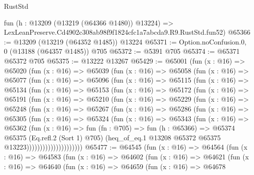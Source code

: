 \begin{lexlean}{RustStd}
\begin{coremodule}
    fun (h : @13209 (@13219 (@64366 @1480)) @13224) =>
    LexLeanPreserve.Cd4902c308ab98f9f1824cfc1a7abcda9.R9.RustStd.fun52)
@65366 := @13209 (@13219 (@64352 @1485)) @13224
@65371 := Option.noConfusion.{0, 0} (@13188 (@64357 @1485)) @705
@65372 := @5391 @705
@65374 := @65371 @65372 @705
@65375 := @13222 @13267
@65429 := @65001
    (fun (x : @16) =>
    @65020
      (fun (x : @16) =>
      @65039
        (fun (x : @16) =>
        @65058
          (fun (x : @16) =>
          @65077
            (fun (x : @16) =>
            @65096
              (fun (x : @16) =>
              @65115
                (fun (x : @16) =>
                @65134
                  (fun (x : @16) =>
                  @65153
                    (fun (x : @16) =>
                    @65172
                      (fun (x : @16) =>
                      @65191
                        (fun (x : @16) =>
                        @65210
                          (fun (x : @16) =>
                          @65229
                            (fun (x : @16) =>
                            @65248
                              (fun (x : @16) =>
                              @65267
                                (fun (x : @16) =>
                                @65286
                                  (fun (x : @16) =>
                                  @65305
                                    (fun (x : @16) =>
                                    @65324
                                      (fun (x : @16) =>
                                      @65343
                                        (fun (x : @16) =>
                                        @65362
                                          (fun (x : @16) =>
                                          fun (fn : @705) =>
                                          fun (h : @65366) =>
                                          @65374
                                            @65375
                                            (Eq.refl.{2} (Sort 1) @705)
                                            (heq_of_eq.{1}
                                              @13208
                                              @65372
                                              @65375
                                              @13223)))))))))))))))))))))
@65477 := @64545
    (fun (x : @16) =>
    @64564
      (fun (x : @16) =>
      @64583
        (fun (x : @16) =>
        @64602
          (fun (x : @16) =>
          @64621
            (fun (x : @16) =>
            @64640
              (fun (x : @16) =>
              @64659
                (fun (x : @16) =>
                @64678

\end{coremodule}
\end{lexlean}
